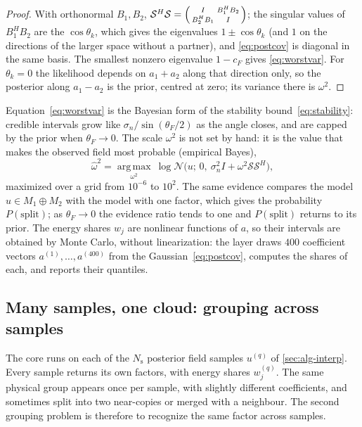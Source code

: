 \documentclass[11pt]{article}
\theoremstyle{plain}
\theoremstyle{definition}
\theoremstyle{remark}
\newcommand{\sumop}{\mathcal{S}}            %
\newcommand{\cF}{c_{F}}                     %
\newcommand{\thetaF}{\theta_{F}}            %
\newcommand{\noise}{\sigma_{n}}             %
\newcommand{\Nsamp}{N_{\mathrm s}}          %
\newcommand{\Normal}{\mathcal{N}}
\begin{document}
\begin{proof}
With orthonormal $B_1,B_2$, $\sumop^H\sumop=\begin{psmallmatrix}I&B_1^HB_2\\B_2^HB_1&I\end{psmallmatrix}$; the singular
values of $B_1^HB_2$ are the $\cos\theta_k$, which gives the eigenvalues $1\pm\cos\theta_k$ (and $1$ on the
directions of the larger space without a partner), and \eqref{eq:postcov} is diagonal in the same basis. The
smallest nonzero eigenvalue $1-\cF$ gives
\eqref{eq:worstvar}. For $\theta_k=0$ the likelihood depends on $a_1+a_2$ along that direction only, so
the posterior along $a_1-a_2$ is the prior, centred at zero; its variance there is $\omega^2$.
\end{proof}

Equation~\eqref{eq:worstvar} is the Bayesian form of the stability bound~\eqref{eq:stability}: credible
intervals grow like $\noise/\sin(\thetaF/2)$ as the angle closes, and are capped by the prior when
$\thetaF\to0$. The scale $\omega^2$ is not set by hand: it is the value that makes the observed field most probable
(empirical Bayes),
\[
  \hat\omega^2=\operatorname*{arg\,max}_{\omega^2}\ \log\Normal\big(u;\,0,\ \noise^2I+\omega^2\sumop\sumop^H\big),
\]
maximized over a grid from $10^{-6}$ to $10^{2}$. The same evidence compares the model
$u\in M_1\oplus M_2$ with the model with one factor, which gives the probability $P(\text{split})$; as
$\thetaF\to0$ the evidence ratio tends to one and $P(\text{split})$ returns to its prior. The energy shares $w_j$ are nonlinear functions of $a$, so their intervals are
obtained by Monte Carlo, without linearization: the layer draws $400$ coefficient vectors $a^{(1)},\dots,a^{(400)}$ from
the Gaussian~\eqref{eq:postcov}, computes the shares of each, and reports their quantiles.

\subsection{Many samples, one cloud: grouping across samples}\label{sec:bayes-cloud}
The core runs on each of the $\Nsamp$ posterior field samples $u^{(q)}$ of \cref{sec:alg-interp}. Every sample
returns its own factors, with energy shares $w_j^{(q)}$. The same physical group appears once per sample, with slightly different
coefficients, and sometimes split into two near-copies or merged with a neighbour. The second grouping
problem is therefore to recognize the same factor across samples.
\end{document}
